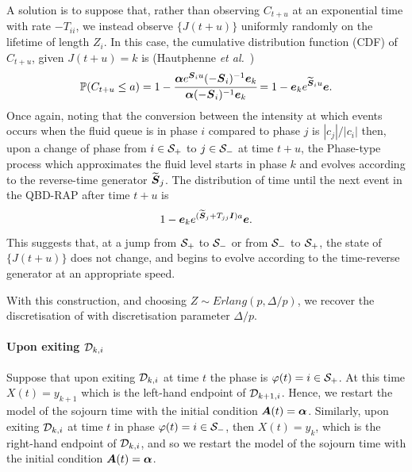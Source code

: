 A solution is to suppose that, rather than observing \(C_{t+u}\) at an exponential time with rate \(-T_{ii}\), we instead observe \(\{J(t+u)\}\) uniformly randomly on the lifetime of length \(Z_i\). In this case, the cumulative distribution function (CDF) of \(C_{t+u}\), given \(J(t+u)=k\) is (Hautphenne \emph{et al.}~\cite[Lemma 3.1]{hmp2017})
\begin{align}\mathbb P(C_{t+u}\leq a) = 1-\cfrac{\boldsymbol \alpha e^{\boldsymbol S_iu}(-\boldsymbol S_i)^{-1}\boldsymbol e_k}{\boldsymbol \alpha (-\boldsymbol S_i)^{-1}\boldsymbol e_k} = 1- \boldsymbol e_k e^{\widetilde{ \boldsymbol S}_iu}\boldsymbol e.\label{eqn:ksda}\end{align}
Once again, noting that the conversion between the intensity at which events occurs when the fluid queue is in phase \(i\) compared to phase \(j\) is \(|c_j|/|c_i|\)%
then, upon a change of phase from \(i\in\mathcal{S}_+\) to \(j\in\mathcal{S}_-\) at time \(t+u\), the Phase-type process which approximates the fluid level starts in phase \(k\) and evolves according to the reverse-time generator \(\widetilde{ \boldsymbol S}_j\). The distribution of time until the next event in the QBD-RAP after time \(t+u\) is 
\[1-\boldsymbol e_k e^{(\widetilde{\boldsymbol S}_j + T_{jj}\boldsymbol I)a}\boldsymbol e.\] 
This suggests that, at a jump from \(\mathcal{S}_+\) to \(\mathcal{S}_-\) or from \(\mathcal{S}_-\) to \(\mathcal{S}_+\), the state of \(\{J(t+u)\}\) does not change, and begins to evolve according to the time-reverse generator at an appropriate speed. 

With this construction, and choosing \(Z\sim Erlang(p,\Delta/p)\), we recover the discretisation of \cite{bo2014} with discretisation parameter \(\Delta/p\).

\paragraph{Upon exiting \(\mathcal{D}_{k,i}\)} Suppose that upon exiting \(\mathcal{D}_{k,i}\) at time \(t\) the phase is \(\varphi(t)=i\in\mathcal{S}_+\). At this time \(X(t)=y_{k+1}\) which is the left-hand endpoint of \(\mathcal{D}_{k+1,i}\). Hence, we restart the model of the sojourn time with the initial condition \(\boldsymbol A(t)=\boldsymbol \alpha\). Similarly, upon exiting \(\mathcal{D}_{k,i}\) at time \(t\) in phase \(\varphi(t)=i\in\mathcal{S}_-\), then \(X(t)=y_k\), which is the right-hand endpoint of \(\mathcal{D}_{k,i}\), and so we restart the model of the sojourn time with the initial condition \(\boldsymbol A(t)=\boldsymbol \alpha\).

